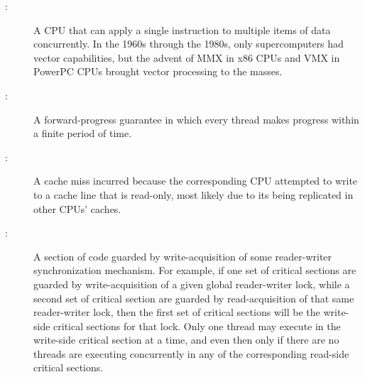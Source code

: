 \begin{description}
\item[:]
	A CPU that can apply a single instruction to multiple items of
	data concurrently.
	In the 1960s through the 1980s, only supercomputers had vector
	capabilities, but the advent of MMX in x86 CPUs and VMX in
	PowerPC CPUs brought vector processing to the masses.
\item[:]
	A forward-progress guarantee in which every thread makes
	progress within a finite period of time.
\item[:]
	A cache miss incurred because the corresponding CPU attempted
	to write to a cache line that is read-only, most likely due
	to its being replicated in other CPUs' caches.
\item[:]
	A section of code guarded by write-acquisition of
	some reader-writer synchronization mechanism.
	For example, if one set of critical sections are guarded by
	write-acquisition of
	a given global reader-writer lock, while a second set of critical
	section are guarded by read-acquisition of that same reader-writer
	lock, then the first set of critical sections will be the
	write-side critical sections for that lock.
	Only one thread may execute in the write-side critical section
	at a time, and even then only if there are no threads are
	executing concurrently in any of the corresponding read-side
	critical sections.
\end{description}
